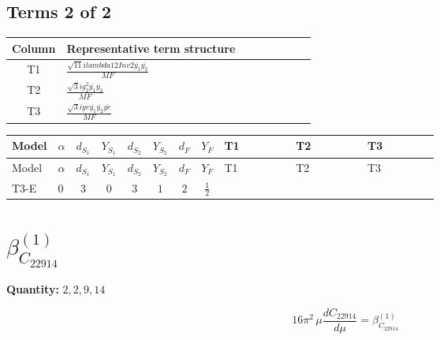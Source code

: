 \documentclass[8pt]{article}
\begin{document}
\begin{landscape}
\subsection*{Terms 2 of 2}
\begin{center}
\begin{tabular}{@{}c >{\raggedright\arraybackslash}p{0.82\linewidth}@{}}
\toprule
Column & Representative term structure \\
\midrule
T1 & \(\displaystyle \frac{\sqrt{11} i lambda12Inv2 \overline{y_{1}} \overline{y_{2}}}{MF}\) \\
\midrule
T2 & \(\displaystyle \frac{\sqrt{3} i g_{2}^{2} \overline{y_{1}} \overline{y_{2}}}{MF}\) \\
\midrule
T3 & \(\displaystyle \frac{\sqrt{3} i ye \overline{y_{1}} \overline{y_{2}} \overline{ye}}{MF}\) \\
\midrule
\bottomrule
\end{tabular}
\end{center}
\smallskip
\tiny
\begin{longtable}{@{}llcccccc >{\raggedright\arraybackslash}p{0.21\linewidth} >{\raggedright\arraybackslash}p{0.21\linewidth} >{\raggedright\arraybackslash}p{0.21\linewidth}@{}}
\toprule
Model & $\alpha$ & $d_{S_1}$ & $Y_{S_1}$ & $d_{S_2}$ & $Y_{S_2}$ & $d_F$ & $Y_F$ & T1 & T2 & T3 \\
\midrule
\endfirsthead
\toprule
Model & $\alpha$ & $d_{S_1}$ & $Y_{S_1}$ & $d_{S_2}$ & $Y_{S_2}$ & $d_F$ & $Y_F$ & T1 & T2 & T3 \\
\midrule
\endhead
T3-E & $0$ & $3$ & $0$ & $3$ & $1$ & $2$ & $\frac{1}{2}$ & \scriptsize\adjustbox{max width=\linewidth}{$\begin{gathered} \frac{3 \sqrt{11} i lambda12Inv2 \overline{y_{1}} \overline{y_{2}}}{22 MF}\end{gathered}$} & \scriptsize\adjustbox{max width=\linewidth}{$\begin{gathered} \frac{11 \sqrt{3} i g_{2}^{2} \overline{y_{1}} \overline{y_{2}}}{8 MF}\end{gathered}$} & \scriptsize\adjustbox{max width=\linewidth}{$\begin{gathered} - \frac{\sqrt{3} i ye \overline{y_{1}} \overline{y_{2}} \overline{ye}}{12 MF}\end{gathered}$} \\
\midrule
\bottomrule
\end{longtable}
\clearpage
\section*{$\beta_{C_{22914}}^{(1)}$}
\noindent\textbf{Quantity: }$\mathrm{2,2,9,14}$\par\smallskip
\[16\pi^2\,\mu\frac{d C_{22914}}{d\mu}=\beta_{C_{22914}}^{(1)}\]

\end{landscape}
\end{document}
